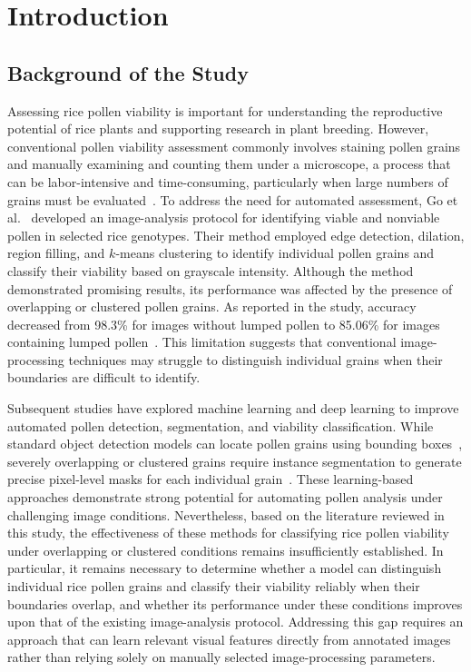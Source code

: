 \newpage
\section{Introduction}
\label{ch:introduction}

\subsection{Background of the Study}
\label{sec:background}

Assessing rice pollen viability is important for understanding the reproductive potential of rice plants and supporting research in plant breeding. However, conventional pollen viability assessment commonly involves staining pollen grains and manually examining and counting them under a microscope, a process that can be labor-intensive and time-consuming, particularly when large numbers of grains must be evaluated~\cite{tan2022,ascari2020}. To address the need for automated assessment, Go et al.~\cite{go2019} developed an image-analysis protocol for identifying viable and nonviable pollen in selected rice genotypes. Their method employed edge detection, dilation, region filling, and $k$-means clustering to identify individual pollen grains and classify their viability based on grayscale intensity. Although the method demonstrated promising results, its performance was affected by the presence of overlapping or clustered pollen grains. As reported in the study, accuracy decreased from 98.3\% for images without lumped pollen to 85.06\% for images containing lumped pollen~\cite{go2019}. This limitation suggests that conventional image-processing techniques may struggle to distinguish individual grains when their boundaries are difficult to identify.

Subsequent studies have explored machine learning and deep learning to improve automated pollen detection, segmentation, and viability classification. While standard object detection models can locate pollen grains using bounding boxes~\cite{tan2022}, severely overlapping or clustered grains require instance segmentation to generate precise pixel-level masks for each individual grain~\cite{zhang2023}. These learning-based approaches demonstrate strong potential for automating pollen analysis under challenging image conditions. Nevertheless, based on the literature reviewed in this study, the effectiveness of these methods for classifying rice pollen viability under overlapping or clustered conditions remains insufficiently established. In particular, it remains necessary to determine whether a model can distinguish individual rice pollen grains and classify their viability reliably when their boundaries overlap, and whether its performance under these conditions improves upon that of the existing image-analysis protocol. Addressing this gap requires an approach that can learn relevant visual features directly from annotated images rather than relying solely on manually selected image-processing parameters.

